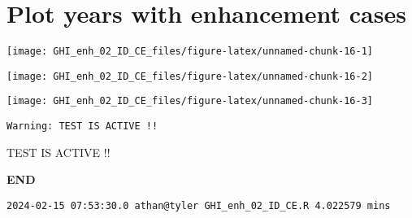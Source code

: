 \documentclass[
  10pt,
  a4paper,oneside]{article}
\begin{document}
\hypertarget{plot-years-with-enhancement-cases}{%
\section{Plot years with enhancement cases}\label{plot-years-with-enhancement-cases}}

\begin{center}\texttt{[image: GHI\_enh\_02\_ID\_CE\_files/figure-latex/unnamed-chunk-16-1]} \end{center}

\begin{center}\texttt{[image: GHI\_enh\_02\_ID\_CE\_files/figure-latex/unnamed-chunk-16-2]} \end{center}

\begin{center}\texttt{[image: GHI\_enh\_02\_ID\_CE\_files/figure-latex/unnamed-chunk-16-3]} \end{center}

\begin{verbatim}
Warning: TEST IS ACTIVE !!
\end{verbatim}

TEST IS ACTIVE !!

\textbf{END}

\begin{verbatim}
2024-02-15 07:53:30.0 athan@tyler GHI_enh_02_ID_CE.R 4.022579 mins
\end{verbatim}
\end{document}
